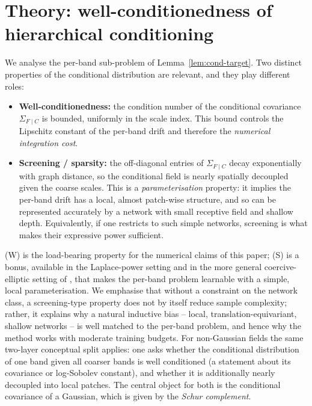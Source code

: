 \documentclass[11pt]{amsart}
\theoremstyle{remark}
\numberwithin{equation}{section}
\begin{document}
\section{Theory: well-conditionedness of hierarchical conditioning}
\label{sec:theory}
We analyse the per-band sub-problem of Lemma~\ref{lem:cond-target}. Two distinct properties of the conditional distribution are relevant, and they play different roles:
\begin{itemize}
\item[(W)] \textbf{Well-conditionedness:} the condition number of the conditional covariance $\Sigma_{F\mid C}$ is bounded, uniformly in the scale index. This bound controls the Lipschitz constant of the per-band drift and therefore the \emph{numerical integration cost}.
\item[(S)] \textbf{Screening / sparsity:} the off-diagonal entries of $\Sigma_{F\mid C}$ decay exponentially with graph distance, so the conditional field is nearly spatially decoupled given the coarse scales. This is a \emph{parameterisation} property: it implies the per-band drift has a local, almost patch-wise structure, and so can be represented accurately by a network with small receptive field and shallow depth. Equivalently, if one restricts to such simple networks, screening is what makes their expressive power sufficient.
\end{itemize}
(W) is the load-bearing property for the numerical claims of this paper; (S) is a bonus, available in the Laplace-power setting and in the more general coercive-elliptic setting of \cite{owhadi2019operator}, that makes the per-band problem learnable with a simple, local parameterisation. We emphasise that without a constraint on the network class, a screening-type property does not by itself reduce sample complexity; rather, it explains why a natural inductive bias -- local, translation-equivariant, shallow networks -- is well matched to the per-band problem, and hence why the method works with moderate training budgets. For non-Gaussian fields the same two-layer conceptual split applies: one asks whether the conditional distribution of one band given all coarser bands is well conditioned (a statement about its covariance or log-Sobolev constant), and whether it is additionally nearly decoupled into local patches. The central object for both is the conditional covariance of a Gaussian, which is given by the \emph{Schur complement}.
\end{document}
